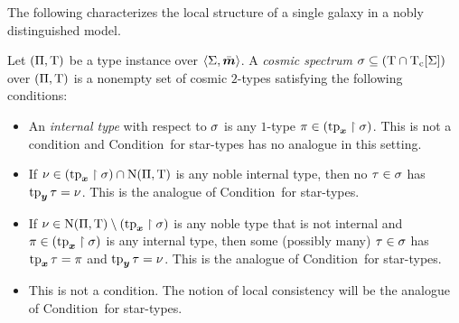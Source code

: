 The following characterizes the local structure of a single galaxy in
a nobly distinguished model.
\begin{definition}
Let $(\Pi,\mathrm{T})$ be a type instance over $\left\langle \mathrm{\Sigma},\bar{\bm{m}} \right\rangle$.
A \emph{cosmic spectrum} $\sigma \subseteq (\mathrm{T} \cap \mathrm{T}_{\mathrm{c}}[\mathrm{\Sigma}])$ over
$(\Pi,\mathrm{T})$ is a nonempty set of cosmic $2$-types satisfying the following
conditions:
\begin{itemize}
  \item[\condcspx]\label{cond:cspx}
  An \emph{internal type} with respect to $\sigma$ is any $1$-type
  $\pi \in (\operatorname{tp}_{\bm{x}}\restriction\sigma)$.
  This is not a condition and Condition~ for star-types has no
  analogue in this setting.
  \item[\condcspnx]\label{cond:cspnx}
  If $\nu \in (\operatorname{tp}_{\bm{x}}\restriction\sigma) \cap \mathrm{\mathrm{N}}(\Pi,\mathrm{T})$ is any noble
  internal type, then no $\tau \in \sigma$ has $\operatorname{tp}_{\bm{y}}\tau = \nu$.
  This is the analogue of Condition~ for star-types.
  \item[\condcspny]\label{cond:cspny}
  If $\nu \in \mathrm{\mathrm{N}}(\Pi,\mathrm{T}) \setminus (\operatorname{tp}_{\bm{x}}\restriction\sigma)$ is any noble type
  that is not internal and $\pi \in (\operatorname{tp}_{\bm{x}}\restriction\sigma)$ is any internal type, then
  some (possibly many) $\tau \in \sigma$ has $\operatorname{tp}_{\bm{x}}\tau = \pi$ and $\operatorname{tp}_{\bm{y}}\tau
  = \nu$.
  This is the analogue of Condition~ for star-types.
  \item[\condcspm]\label{cond:cspm}
  This is not a condition. The notion of local consistency
  will be the analogue of Condition~ for star-types.
\end{itemize}
\end{definition}

